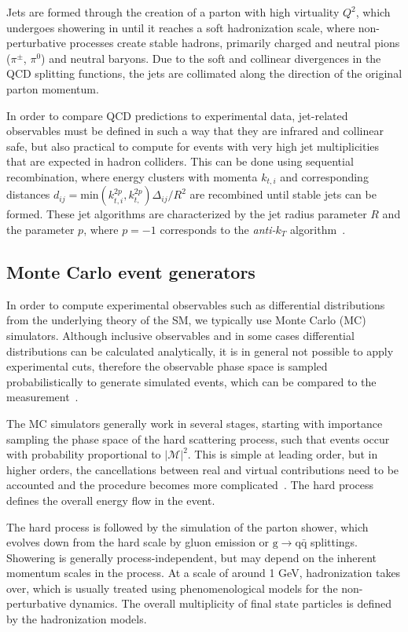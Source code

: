 Jets are formed through the creation of a parton with high virtuality $Q^2$, which undergoes showering in until it reaches a soft hadronization scale, where non-perturbative processes create stable hadrons, primarily charged and neutral pions ($\pi^\pm$, $\pi^0$) and neutral baryons. Due to the soft and collinear divergences in the QCD splitting functions, the jets are collimated along the direction of the original parton momentum.

In order to compare QCD predictions to experimental data, jet-related observables must be defined in such a way that they are infrared and collinear safe, but also practical to compute for events with very high jet multiplicities that are expected in hadron colliders. This can be done using sequential recombination, where energy clusters with momenta $k_{t,i}$ and corresponding distances $d_{ij} = \mathrm{min}(k_{t,i}^{2p}, k_{t,}^{2p}) \Delta_{ij} / R^2$ are recombined until stable jets can be formed. These jet algorithms are characterized by the jet radius parameter $R$ and the parameter $p$, where $p=-1$ corresponds to the \textit{anti-$k_T$} algorithm~\cite{Cacciari:2008gp}.

\subsection{Monte Carlo event generators}
In order to compute experimental observables such as differential distributions from the underlying theory of the SM, we typically use Monte Carlo (MC) simulators. Although inclusive observables and in some cases differential distributions can be calculated analytically, it is in general not possible to apply experimental cuts, therefore the observable phase space is sampled probabilistically to generate simulated events, which can be compared to the measurement~\cite{Sjostrand:2006za}.

The MC simulators generally work in several stages, starting with importance sampling the phase space of the hard scattering process, such that events occur with probability proportional to $|\mathcal{M}|^2$. This is simple at leading order, but in higher orders, the cancellations between real and virtual contributions need to be accounted and the procedure becomes more complicated~\cite{Frixione:2002ik}. The hard process defines the overall energy flow in the event.

The hard process is followed by the simulation of the parton shower, which evolves down from the hard scale by gluon emission or $\mathrm{g} \rightarrow \mathrm{q} \bar{\mathrm{q}}$ splittings. Showering is generally process-independent, but may depend on the inherent momentum scales in the process. At a scale of around 1 GeV, hadronization takes over, which is usually treated using phenomenological models for the non-perturbative dynamics. The overall multiplicity of final state particles is defined by the hadronization models.

